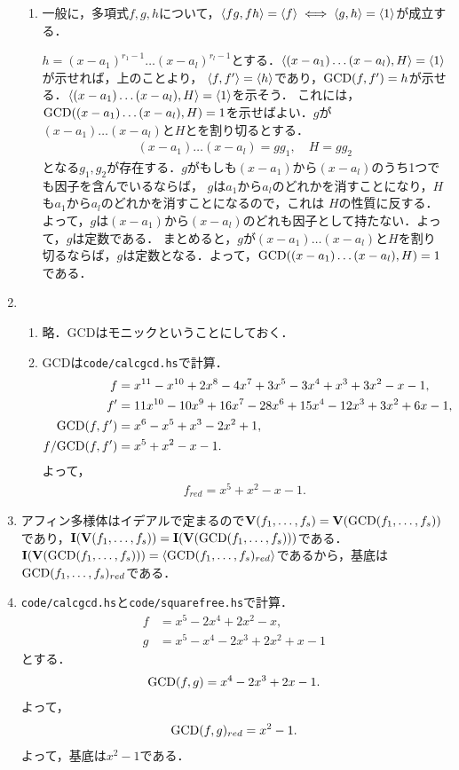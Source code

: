 \documentclass[9pt]{ltjsarticle}
\begin{document}
\begin{enumerate}[label=(問題\arabic*)]
\begin{enumerate}[label=(\alph*)]
 \item {}
一般に，多項式$f,g,h$について，$\left\langle fg,fh \right\rangle=\left\langle f \right\rangle \iff \left\langle g,h \right\rangle = \left\langle 1 \right\rangle$が成立する．

$h=(x-a_1)^{r_1-1}\dots (x-a_l)^{r_l-1}$とする．$\left\langle (x-a_1)\dots (x-a_l),H \right\rangle=\left\langle 1 \right\rangle$が示せれば，上のことより，
$\left\langle f,f' \right\rangle=\left\langle h \right\rangle$であり，${\rm GCD}(f,f')=h$が示せる．$\left\langle (x-a_1)\dots (x-a_l),H \right\rangle=\left\langle 1 \right\rangle$を示そう．
これには，${\rm GCD}((x-a_1)\dots (x-a_l),H)=1$を示せばよい．$g$が$(x-a_1)\dots(x-a_l)$と$H$とを割り切るとする．
\begin{align}
 (x-a_1)\dots (x-a_l) = gg_1,\quad H = gg_2
\end{align}
となる$g_1,g_2$が存在する．$g$がもしも$(x-a_1)$から$(x-a_l)$のうち1つでも因子を含んでいるならば，
$g$は$a_1$から$a_l$のどれかを消すことになり，$H$も$a_1$から$a_l$のどれかを消すことになるので，これは
$H$の性質に反する．よって，$g$は$(x-a_1)$から$(x-a_l)$のどれも因子として持たない．よって，$g$は定数である．
まとめると，$g$が$(x-a_1)\dots(x-a_l)$と$H$を割り切るならば，$g$は定数となる．よって，${\rm GCD}((x-a_1)\dots (x-a_l),H)=1$である．
\end{enumerate}

 \item
\begin{enumerate}[label=(\alph*)]
 \item 略．GCDはモニックということにしておく．
 \item  GCDは{\tt code/calcgcd.hs}で計算．
\begin{align}
 f&= x^{11} - x^{10} +2x^8 -4x^7 +3x^5 -3x^4+x^3 +3x^2 -x-1,\\
 f'& = 11x^{10} - 10x^9 + 16x^7 - 28x^6 + 15x^4 -12x^3 + 3x^2 + 6x -1,\\
 {\rm GCD}(f,f')& = x^6 -x^5 +x^3 -2x^2 + 1,\\
 f/{\rm GCD}(f,f')& = x^5 + x^2 -x -1.
\end{align}
よって，
\begin{align}
 f_{red} = x^5 + x^2 -x -1.
\end{align}
\end{enumerate}
 \item アフィン多様体はイデアルで定まるので$\textbf V(f_1,\dots,f_s)=\textbf V({\rm GCD}(f_1,\dots,f_s))$であり，$\textbf I(\textbf V(f_1,\dots,f_s))=\textbf I(\textbf V({\rm GCD}(f_1,\dots,f_s)))$である．$\textbf I(\textbf V({\rm GCD}(f_1,\dots,f_s)))=\left\langle {\rm GCD}(f_1,\dots,f_s)_{red} \right\rangle$であるから，基底は${\rm GCD}(f_1,\dots,f_s)_{red}$である．
 \item {\tt code/calcgcd.hs}と{\tt code/squarefree.hs}で計算．
\begin{align}
 f &= x^5-2x^4+2x^2-x,\\
 g& = x^5-x^4-2x^3+2x^2+x-1
\end{align}
とする．
\begin{align}
 {\rm GCD}(f,g) = x^4 -2x^3 + 2x -1.
\end{align}
よって，
\begin{align}
 {\rm GCD}(f,g)_{red} = x^2 - 1.
\end{align}
よって，基底は$x^2-1$である．
\end{enumerate}
\end{document}
